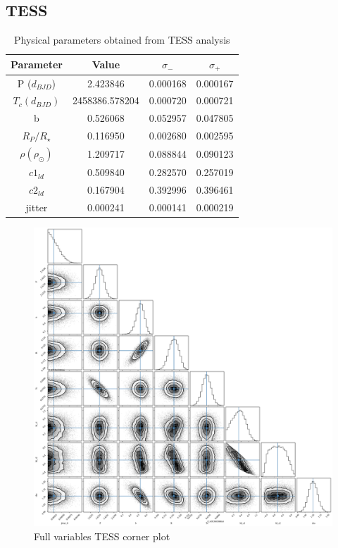 \documentclass[a4paper,11pt,twocolumn]{article}
\begin{document}
\subsection{TESS}




 \begin{table}[h!]
 \centering
    \begin{tabular}{cccc}
    \hline
     Parameter& Value & $\sigma_{-}$ & $\sigma_{+}$\\
    \hline
    P ($d_{BJD}$)   &  2.423846   &  0.000168 &     0.000167 \\
    $T_{c} (d_{BJD})$ &  2458386.578204 & 0.000720  & 0.000721  \\ 
    b & 0.526068  & 0.052957    & 0.047805  \\
    $R_{P }/ R_{\star}$&  0.116950 & 0.002680   &  0.002595\\
    $\rho (\rho_{\odot})$ & 1.209717 & 0.088844  &  0.090123\\
    $c1_{ld}$ & 0.509840    & 0.282570  & 0.257019\\
    $c2_{ld}$ &0.167904 & 0.392996 & 0.396461\\
    jitter & 0.000241 &0.000141 &0.000219 \\
    \hline
    \end{tabular} 
  \caption{Physical parameters obtained from TESS analysis}
 \label{table:1}
 \end{table}



\begin{figure}
  \centering
    \includegraphics[scale=0.2, angle=0]{../pictures/tess/acf_tess.pdf}
     \caption{Full variables TESS corner plot}
    \label{fig: cptess}
\end{figure}
\end{document}
